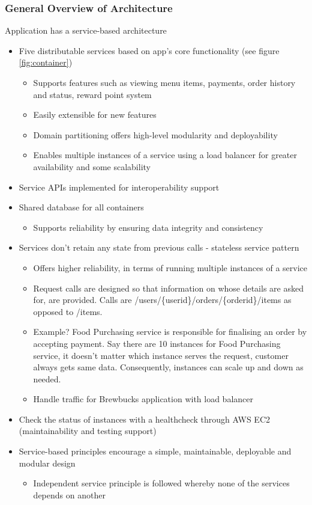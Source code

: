 \documentclass{article}
\begin{document}
\subsubsection*{General Overview of Architecture}
\medskip \noindent Application has a service-based architecture
\begin{itemize}
    \item Five distributable services based on app's core functionality (see figure \ref{fig:container})
    \begin{itemize}
     \item Supports features such as viewing menu items, payments, order history and status, reward point system
     \item Easily extensible for new features
     \item Domain partitioning offers high-level modularity and deployability
     \item Enables multiple instances of a service using a load balancer for greater availability and some scalability
   \end{itemize}
   \item Service APIs implemented for interoperability support
   \item Shared database for all containers 
    \begin{itemize}
     \item Supports reliability by ensuring data integrity and consistency
    \end{itemize}
   \item Services don't retain any state from previous calls - stateless service pattern
    \begin{itemize}
    \item Offers higher reliability, in terms of running multiple instances of a service
    \item  Request calls are designed so that information on whose details are asked for, are provided. Calls are /users/\{userid\}/orders/\{orderid\}/items as opposed to /items.
     \item Example? Food Purchasing service is responsible for finalising an order by accepting payment. Say there are 10 instances for Food Purchasing service, it doesn't matter which instance serves the request, customer always gets same data. Consequently, instances can scale up and down as needed.
     \item Handle traffic for Brewbucks application with load balancer
    \end{itemize}
    \item Check the status of instances with a healthcheck through AWS EC2 (maintainability and testing support)
    \item Service-based principles encourage a simple, maintainable, deployable and modular design
    \begin{itemize}
     \item Independent service principle is followed whereby none of the services depends on another
    \end{itemize}
\end{itemize}
\end{document}
